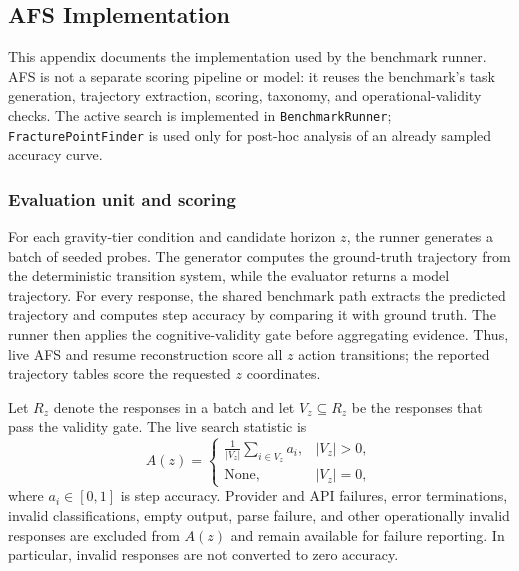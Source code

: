 \documentclass{article}
\begin{document}
\subsection{AFS Implementation}
\label{app:afs_implementation}
This appendix documents the implementation used by the benchmark runner. AFS is not a separate scoring pipeline or model: it reuses the benchmark's task generation, trajectory extraction, scoring, taxonomy, and operational-validity checks. The active search is implemented in \texttt{BenchmarkRunner}; \texttt{FracturePointFinder} is used only for post-hoc analysis of an already sampled accuracy curve.

\subsubsection{Evaluation unit and scoring}
For each gravity-tier condition and candidate horizon $z$, the runner generates a batch of seeded probes. The generator computes the ground-truth trajectory from the deterministic transition system, while the evaluator returns a model trajectory. For every response, the shared benchmark path extracts the predicted trajectory and computes step accuracy by comparing it with ground truth. The runner then applies the cognitive-validity gate before aggregating evidence. Thus, live AFS and resume reconstruction score all $z$ action transitions; the reported trajectory tables score the requested $z$ coordinates.

Let $R_z$ denote the responses in a batch and let $V_z\subseteq R_z$ be the responses that pass the validity gate. The live search statistic is
\[
A(z)=
\begin{cases}
\frac{1}{|V_z|}\sum_{i\in V_z} a_i, & |V_z|>0,\\
\mathrm{None}, & |V_z|=0,
\end{cases}
\]
where $a_i\in[0,1]$ is step accuracy. Provider and API failures, error terminations, invalid classifications, empty output, parse failure, and other operationally invalid responses are excluded from $A(z)$ and remain available for failure reporting. In particular, invalid responses are not converted to zero accuracy.
\end{document}
